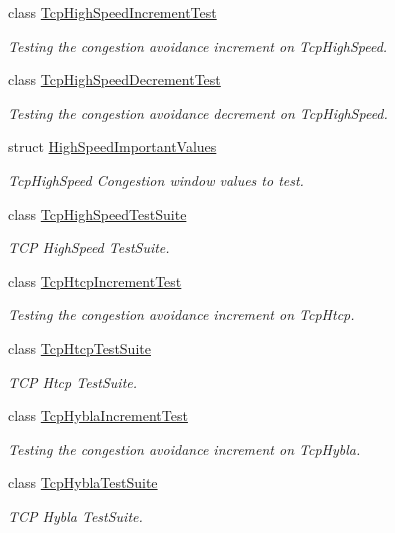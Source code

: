 \begin{DoxyCompactItemize}
class \hyperlink{classTcpHighSpeedIncrementTest}{Tcp\+High\+Speed\+Increment\+Test}
\begin{DoxyCompactList}\small\item\em Testing the congestion avoidance increment on Tcp\+High\+Speed. \end{DoxyCompactList}\item 
class \hyperlink{classTcpHighSpeedDecrementTest}{Tcp\+High\+Speed\+Decrement\+Test}
\begin{DoxyCompactList}\small\item\em Testing the congestion avoidance decrement on Tcp\+High\+Speed. \end{DoxyCompactList}\item 
struct \hyperlink{structHighSpeedImportantValues}{High\+Speed\+Important\+Values}
\begin{DoxyCompactList}\small\item\em Tcp\+High\+Speed Congestion window values to test. \end{DoxyCompactList}\item 
class \hyperlink{classTcpHighSpeedTestSuite}{Tcp\+High\+Speed\+Test\+Suite}
\begin{DoxyCompactList}\small\item\em T\+CP High\+Speed Test\+Suite. \end{DoxyCompactList}\item 
class \hyperlink{classTcpHtcpIncrementTest}{Tcp\+Htcp\+Increment\+Test}
\begin{DoxyCompactList}\small\item\em Testing the congestion avoidance increment on Tcp\+Htcp. \end{DoxyCompactList}\item 
class \hyperlink{classTcpHtcpTestSuite}{Tcp\+Htcp\+Test\+Suite}
\begin{DoxyCompactList}\small\item\em T\+CP Htcp Test\+Suite. \end{DoxyCompactList}\item 
class \hyperlink{classTcpHyblaIncrementTest}{Tcp\+Hybla\+Increment\+Test}
\begin{DoxyCompactList}\small\item\em Testing the congestion avoidance increment on Tcp\+Hybla. \end{DoxyCompactList}\item 
class \hyperlink{classTcpHyblaTestSuite}{Tcp\+Hybla\+Test\+Suite}
\begin{DoxyCompactList}\small\item\em T\+CP Hybla Test\+Suite. \end{DoxyCompactList}\item 

\end{DoxyCompactItemize}
